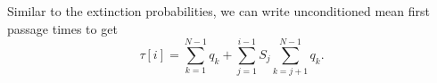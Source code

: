 Similar to the extinction probabilities, we can write unconditioned mean first passage times to get
\begin{equation}
\tau[i] = \sum_{k=1}^{N-1}q_k + \sum_{j=1}^{i-1}S_{j}\sum_{k=j+1}^{N-1}q_k. 
\end{equation}
